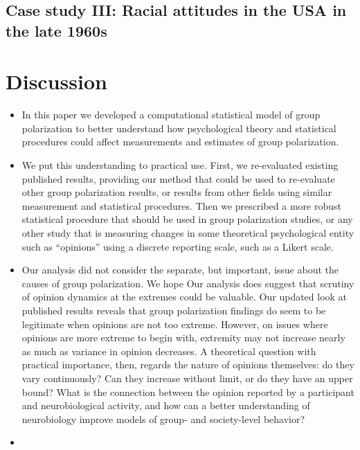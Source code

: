 \documentclass[11pt,letterpaper]{article}
\begin{document}


\subsection{Case study III: Racial attitudes in the USA in the late 1960s}


\section{Discussion}

\begin{itemize}
  \item 
    In this paper we developed a computational statistical model of group
    polarization to better understand how psychological theory and statistical 
    procedures could affect measurements and estimates of group polarization. 
  \item
    We put this understanding to 
    practical use. First, we re-evaluated existing published results, providing our
    method that could be used to re-evaluate other group polarization results,
    or results from other fields using similar measurement and statistical
    procedures. Then we prescribed a more robust statistical procedure that should
    be used in group polarization studies, or any other study that is measuring
    changes in some theoretical psychological entity such as ``opinions'' using
    a discrete reporting scale, such as a Likert scale.
  \item
    Our analysis did not consider the separate, but important, issue about
    the causes of group polarization. We hope Our analysis does suggest that 
    scrutiny of opinion dynamics at the extremes could be valuable.
    Our updated look at 
    published results reveals that group polarization findings do seem to be
    legitimate when opinions are not too extreme. However, on issues where
    opinions are more extreme to begin with, extremity may not increase 
    nearly as much as variance in opinion decreases. 
    A theoretical question with practical importance, then, regards the
    nature of opinions themselves: do they vary continuously? Can they increase
    without limit, or do they have an upper bound? What is the connection 
    between the opinion reported by a participant and neurobiological 
    activity, and how can a better understanding of neurobiology improve
    models of group- and society-level behavior? 
  \item

\end{itemize}
\end{document}
